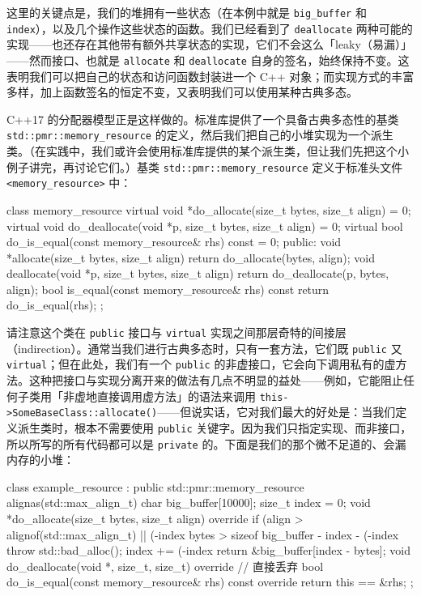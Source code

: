这里的关键点是，我们的堆拥有一些状态（在本例中就是 \texttt{big\_\allowbreak{}buffer} 和 \texttt{index}），以及几个操作这些状态的函数。我们已经看到了 \texttt{deallocate} 两种可能的实现——也还存在其他带有额外共享状态的实现，它们不会这么「leaky（易漏）」——然而接口、也就是 \texttt{allocate} 和 \texttt{deallocate} 自身的签名，始终保持不变。这表明我们可以把自己的状态和访问函数封装进一个 C++ 对象；而实现方式的丰富多样，加上函数签名的恒定不变，又表明我们可以使用某种古典多态。

C++17 的分配器模型正是这样做的。标准库提供了一个具备古典多态性的基类 \texttt{std::\allowbreak{}pmr::\allowbreak{}memory\_\allowbreak{}resource} 的定义，然后我们把自己的小堆实现为一个派生类。（在实践中，我们或许会使用标准库提供的某个派生类，但让我们先把这个小例子讲完，再讨论它们。）基类 \texttt{std::\allowbreak{}pmr::\allowbreak{}memory\_\allowbreak{}resource} 定义于标准头文件 \texttt{<memory\_\allowbreak{}resource>\allowbreak{}} 中：

\begin{codebox}[cpp]
    class memory_resource {
      virtual void *do_allocate(size_t bytes, size_t align) = 0;
      virtual void do_deallocate(void *p, size_t bytes, size_t align) = 0;
      virtual bool do_is_equal(const memory_resource& rhs) const = 0;
    public:
      void *allocate(size_t bytes, size_t align) {
        return do_allocate(bytes, align);
      }
      void deallocate(void *p, size_t bytes, size_t align) {
        return do_deallocate(p, bytes, align);
      }
      bool is_equal(const memory_resource& rhs) const {
        return do_is_equal(rhs);
      }
    };
\end{codebox}

请注意这个类在 \texttt{public} 接口与 \texttt{virtual} 实现之间那层奇特的间接层（indirection）。通常当我们进行古典多态时，只有一套方法，它们既 \texttt{public} 又 \texttt{virtual}；但在此处，我们有一个 \texttt{public} 的非虚接口，它会向下调用私有的虚方法。这种把接口与实现分离开来的做法有几点不明显的益处——例如，它能阻止任何子类用「非虚地直接调用虚方法」的语法来调用 \texttt{this->Some\allowbreak{}Base\allowbreak{}Class::\allowbreak{}allocate(\allowbreak{})\allowbreak{}}——但说实话，它对我们最大的好处是：当我们定义派生类时，根本不需要使用 \texttt{public} 关键字。因为我们只指定实现、而非接口，所以所写的所有代码都可以是 \texttt{private} 的。下面是我们的那个微不足道的、会漏内存的小堆：

\begin{codebox}[cpp]
    class example_resource : public std::pmr::memory_resource {
      alignas(std::max_align_t) char big_buffer[10000];
      size_t index = 0;
      void *do_allocate(size_t bytes, size_t align) override {
        if (align > alignof(std::max_align_t) ||
            (-index %
            bytes > sizeof big_buffer - index - (-index %
        {
            throw std::bad_alloc();
        }
        index += (-index %
        return &big_buffer[index - bytes];
      }
      void do_deallocate(void *, size_t, size_t) override {
        // 直接丢弃
      }
      bool do_is_equal(const memory_resource& rhs) const override {
        return this == &rhs;
      }
    };
\end{codebox}

